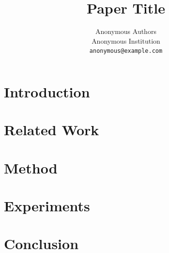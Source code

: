 \documentclass{article}
\title{Paper Title}
\author{
  Anonymous Authors\\
  Anonymous Institution\\
  \texttt{anonymous@example.com}
}
\begin{document}
\maketitle


\begin{abstract}
    
\end{abstract}



\section{Introduction}
\label{sec:intro}



\section{Related Work}
\label{sec:related}



\section{Method}
\label{sec:method}



\section{Experiments}
\label{sec:experiments}



\section{Conclusion}
\label{sec:conclusion}

\end{document}
